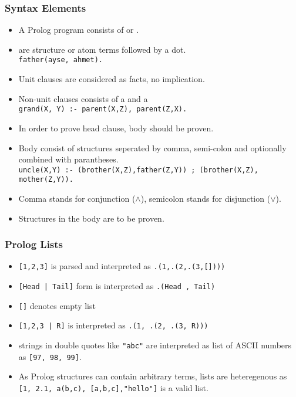 \begin{frame}[fragile]
\frametitle{Syntax Elements}
\begin{itemize}
\item A Prolog program consists of  or .
\item {} are structure or atom terms followed by a dot.\\
    \lstinline!father(ayse, ahmet).!
\item Unit clauses are considered as facts, no implication.
\item Non-unit clauses consists of a  and a \\
    \lstinline!grand(X, Y) :- parent(X,Z), parent(Z,X).!
\item In order to prove head clause, body should be proven.
\item Body consist of structures seperated by comma, semi-colon and optionally combined with
parantheses.\\
    \lstinline{uncle(X,Y) :- (brother(X,Z),father(Z,Y)) ; (brother(X,Z), mother(Z,Y)).}
\item Comma stands for conjunction ($\wedge$), semicolon stands for disjunction ($\vee$).
\item Structures in the body are  to be proven.
\end{itemize}
\end{frame}

\begin{frame}
\frametitle{Prolog Lists}
\begin{itemize}
\item \lstinline![1,2,3]! is parsed and interpreted as \lstinline!.(1,.(2,.(3,[])))!
\item \lstinline![Head | Tail]! form is interpreted as \lstinline!.(Head , Tail)!
\item \lstinline![]! denotes empty list
\item \lstinline![1,2,3 | R]! is interpreted as \lstinline!.(1, .(2, .(3, R)))!
\item strings in double quotes like \lstinline!"abc"! are interpreted as
list of ASCII numbers as \lstinline![97, 98, 99]!.
\item As Prolog structures can contain arbitrary terms,  lists are heteregenous as 
\lstinline![1, 2.1, a(b,c), [a,b,c],"hello"]! is a valid list.
\end{itemize}
\end{frame}

